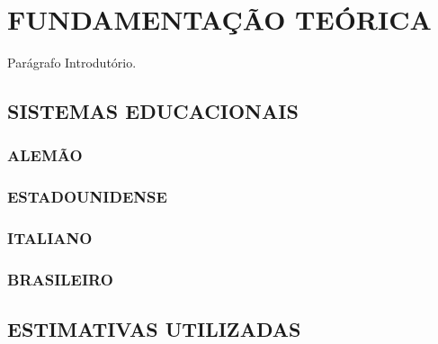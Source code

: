 \documentclass[12pt,a4paper]{article}
\begin{document}
	\section{FUNDAMENTAÇÃO TEÓRICA}

		\par Parágrafo Introdutório.

		\subsection{SISTEMAS EDUCACIONAIS}

			\lipsum[1]

			\subsubsection{ALEMÃO}

				\lipsum[1]

			\subsubsection{ESTADOUNIDENSE}

				\lipsum[1]

			\subsubsection{ITALIANO}

				\lipsum[1]

			\subsubsection{BRASILEIRO}

				\lipsum[1]


		\subsection{ESTIMATIVAS UTILIZADAS}
\end{document}
